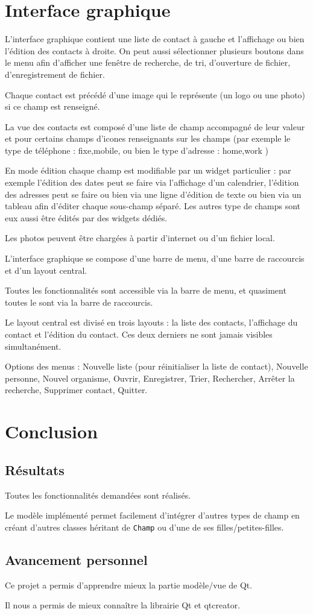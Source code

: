 \documentclass[a4paper,12pt]{report}
\begin{document}
\chapter{Interface graphique}
\par
L'interface graphique contient une liste de contact à gauche et l'affichage ou bien l'édition des contacts à droite. On peut aussi sélectionner plusieurs boutons dans le menu afin d'afficher une fenêtre de recherche, de tri, d'ouverture de fichier, d'enregistrement de fichier.
\par
Chaque contact est précédé d'une image qui le représente (un logo ou une photo) si ce champ est renseigné.
\par
La vue des contacts est composé d'une liste de champ accompagné de leur valeur et pour certains champs d'icones renseignants sur les champs (par exemple le type de téléphone : fixe,mobile, ou bien le type d'adresse : home,work )
\par
En mode édition chaque champ est modifiable par un widget particulier : par exemple l'édition des dates peut se faire via l'affichage d'un calendrier, l'édition des adresses peut se faire ou bien via une ligne d'édition de texte ou bien via un tableau afin d'éditer chaque sous-champ séparé. Les autres type de champs sont eux aussi être édités par des widgets dédiés.
\par
Les photos peuvent être chargées à partir d'internet ou d'un fichier local.
\par
L'interface graphique se compose d'une barre de menu, d'une barre de raccourcis et d'un layout central.
\par
Toutes les fonctionnalités sont accessible via la barre de menu, et quasiment toutes le sont via la barre de raccourcis.
\par
Le layout central est divisé en trois layouts : la liste des contacts, l'affichage du contact et l'édition du contact.
Ces deux derniers ne sont jamais visibles simultanément.
\par
Options des menus :
Nouvelle liste (pour réinitialiser la liste de contact), Nouvelle personne, Nouvel organisme, Ouvrir, Enregistrer, Trier, Rechercher, Arrêter la recherche, Supprimer contact, Quitter.

\chapter{Conclusion}
\section{Résultats}
\par
Toutes les fonctionnalités demandées sont réalisés.
\par
Le modèle implémenté permet facilement d'intégrer d'autres types de champ en créant d'autres classes héritant de \texttt{Champ} ou d'une de ses filles/petites-filles.
\par

\section{Avancement personnel}
\par
Ce projet a permis d'apprendre mieux la partie modèle/vue de Qt.

Il nous a permis de mieux connaître la librairie Qt et qtcreator.
\end{document}
